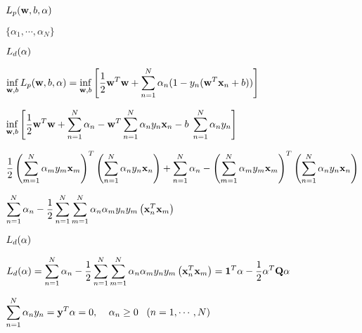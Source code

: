 \documentclass{article}
\def\lthtmlcheckvsize{\ifdim\ht\sizebox<\vsize 
  \ifdim\wd\sizebox<\hsize\expandafter\hfill\fi \expandafter\vfill
  \else\expandafter\vss\fi}%
\begin{document}
{\newpage\clearpage
{}%
$ L_p({\bf w},b,{\bf\alpha})$%
\lthtmlindisplaymathZ
\lthtmlcheckvsize\clearpage}

{\newpage\clearpage
{}%
$ \{\alpha_1,\cdots,\alpha_N\}$%
\lthtmlindisplaymathZ
\lthtmlcheckvsize\clearpage}

{\newpage\clearpage
{}%
$\displaystyle L_d({\bf\alpha})$%
\lthtmlindisplaymathZ
\lthtmlcheckvsize\clearpage}

{\newpage\clearpage
{}%
$\displaystyle \inf_{{\bf w},b} L_p({\bf w},b,{\bf\alpha})
=\inf_{{\bf w},b}\left[\frac{1}{2}{\bf w}^T{\bf w}
+\sum_{n=1}^N \alpha_n(1-y_n( {\bf w}^T {\bf x}_n+b)) \right]$%
\lthtmlindisplaymathZ
\lthtmlcheckvsize\clearpage}

{\newpage\clearpage
{}%
$\displaystyle \inf_{{\bf w},b}\left[\frac{1}{2}{\bf w}^T{\bf w}
+\sum_{n=1}^N \alpha_n -{\bf w}^T \sum_{n=1}^N \alpha_ny_n{\bf x}_n
-b\;\sum_{n=1}^N \alpha_ny_n \right]$%
\lthtmlindisplaymathZ
\lthtmlcheckvsize\clearpage}

{\newpage\clearpage
{}%
$\displaystyle \frac{1}{2} \left(\sum_{m=1}^N \alpha_m y_m {\bf x}_m\right)^T
\left(\sum_{n=1}^N \alpha_n y_n {\bf x}_n\right)+\sum_{n=1}^N \alpha_n
-\left(\sum_{m=1}^N \alpha_m y_m {\bf x}_m\right)^T
\left(\sum_{n=1}^N \alpha_n y_n {\bf x}_n\right)$%
\lthtmlindisplaymathZ
\lthtmlcheckvsize\clearpage}

{\newpage\clearpage
{}%
$\displaystyle \sum_{n=1}^N\alpha_n -\frac{1}{2}
\sum_{n=1}^N \sum_{m=1}^N \alpha_n \alpha_m y_n y_m
\left({\bf x}_n^T{\bf x}_m\right)$%
\lthtmlindisplaymathZ
\lthtmlcheckvsize\clearpage}

{\newpage\clearpage
{}%
$ L_d({\bf\alpha})$%
\lthtmlindisplaymathZ
\lthtmlcheckvsize\clearpage}

{\newpage\clearpage
{}%
$\displaystyle L_d({\bf\alpha})
=\sum_{n=1}^N\alpha_n -\frac{1}{2}
\sum_{n=1}^N \sum_{m=1}^N \alpha_n \alpha_m y_n y_m
\left({\bf x}_n^T{\bf x}_m\right)
={\bf 1}^T{\bf\alpha}-\frac{1}{2}{\bf\alpha}^T{\bf Q}{\bf\alpha}$%
\lthtmlindisplaymathZ
\lthtmlcheckvsize\clearpage}

{\newpage\clearpage
{}%
$\displaystyle \sum_{n=1}^N \alpha_n y_n
={\bf y}^T{\bf\alpha}=0, \;\;\;\; \alpha_n\ge 0\;\;\;(n=1,\cdots,N)$%
\lthtmlindisplaymathZ
\lthtmlcheckvsize\clearpage}
\end{document}
